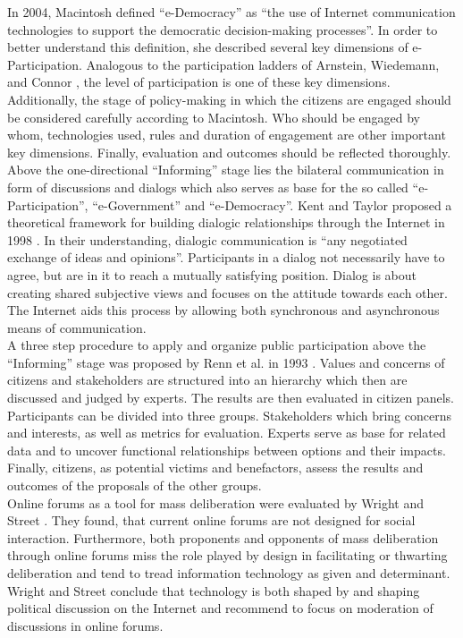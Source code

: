 In 2004, Macintosh \cite{Macintosh2004_eParticipation_characterization} defined ``e-Democracy'' as ``the use of Internet communication technologies to support the democratic decision-making processes''. In order to better understand this definition, she described several key dimensions of e-Participation. Analogous to the participation ladders of Arnstein, Wiedemann, and Connor \cite{Arnstein1969_citizen_participation,Wiedemann1993355,Connor1988_new_ladder}, the level of participation is one of these key dimensions. Additionally, the stage of policy-making in which the citizens are engaged should be considered carefully according to Macintosh. Who should be engaged by whom, technologies used, rules and duration of engagement are other important key dimensions. Finally, evaluation and outcomes should be reflected thoroughly.\\
Above the one-directional ``Informing'' stage lies the bilateral communication in form of discussions and dialogs which also serves as base for the so called ``e-Participation'', ``e-Government'' and ``e-Democracy''. Kent and Taylor proposed a theoretical framework for building dialogic relationships through the Internet in 1998 \cite{Kent1998_dialogic_relationships_through_www}. In their understanding, dialogic communication is ``any negotiated exchange of ideas and opinions''. Participants in a dialog not necessarily have to agree, but are in it to reach a mutually satisfying position. Dialog is about creating shared subjective views and focuses on the attitude towards each other. The Internet aids this process by allowing both synchronous and asynchronous means of communication.\\
A three step procedure to apply and organize public participation above the ``Informing'' stage was proposed by Renn et al. in 1993 \cite{Renn1993_participation}. Values and concerns of citizens and stakeholders are structured into an hierarchy which then are discussed and judged by experts. The results are then evaluated in citizen panels. Participants can be divided into three groups. Stakeholders which bring concerns and interests, as well as metrics for evaluation. Experts serve as base for related data and to uncover functional relationships between options and their impacts. Finally, citizens, as potential victims and benefactors, assess the results and outcomes of the proposals of the other groups.\\
Online forums as a tool for mass deliberation were evaluated by Wright and Street \cite{Wright2007_deliberation_design}. They found, that current online forums are not designed for social interaction. Furthermore, both proponents and opponents of mass deliberation through online forums miss the role played by design in facilitating or thwarting deliberation and tend to tread information technology as given and determinant. Wright and Street conclude that technology is both shaped by and shaping political discussion on the Internet and recommend to focus on moderation of discussions in online forums.\\

